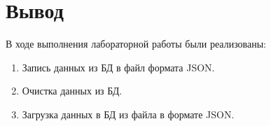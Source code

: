 \section{Вывод}
В ходе выполнения лабораторной работы были реализованы:
\begin{enumerate}
	\item Запись данных из БД в файл формата JSON.
	\item Очистка данных из БД.
	\item Загрузка данных в БД из файла в формате JSON.
\end{enumerate}